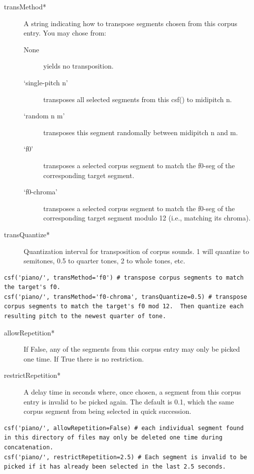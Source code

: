 \documentclass{article}
\begin{document}
\begin{spacing}{1.2}
\begin{description}
\item[transMethod*] A string indicating how to transpose segments chosen from this corpus entry.  You may chose from:
\begin{description}
\item[None] yields no transposition.
\item[`single-pitch n'] transposes all selected segments from this csf() to midipitch n.
\item[`random n m'] transposes this segment randomally between midipitch n and m.
\item[`f0'] transposes a selected corpus segment to match the f0-seg of the corresponding target segment.
\item[`f0-chroma'] transposes a selected corpus segment to match the f0-seg of the corresponding target segment modulo 12 (i.e., matching its chroma).
\end{description}

\item[transQuantize*] Quantization interval for transposition of corpus sounds.  1 will quantize to semitones, 0.5 to quarter tones, 2 to whole tones, etc.

\end{description}
\begin{lstlisting}
csf('piano/', transMethod='f0') # transpose corpus segments to match the target's f0.
csf('piano/', transMethod='f0-chroma', transQuantize=0.5) # transpose corpus segments to match the target's f0 mod 12.  Then quantize each resulting pitch to the newest quarter of tone.
\end{lstlisting}
\begin{description}

\item[allowRepetition*] If False, any of the segments from this corpus entry may only be picked one time.  If True there is no restriction.

\item[restrictRepetition*] A delay time in seconds where, once chosen, a segment from this corpus entry is invalid to be picked again.  The default is 0.1, which the same corpus segment from being selected in quick succession.

\end{description}
\begin{lstlisting}
csf('piano/', allowRepetition=False) # each individual segment found in this directory of files may only be deleted one time during concatenation.
csf('piano/', restrictRepetition=2.5) # Each segment is invalid to be picked if it has already been selected in the last 2.5 seconds.
\end{lstlisting}
\begin{description}



\end{description}
\end{spacing}
\end{document}
